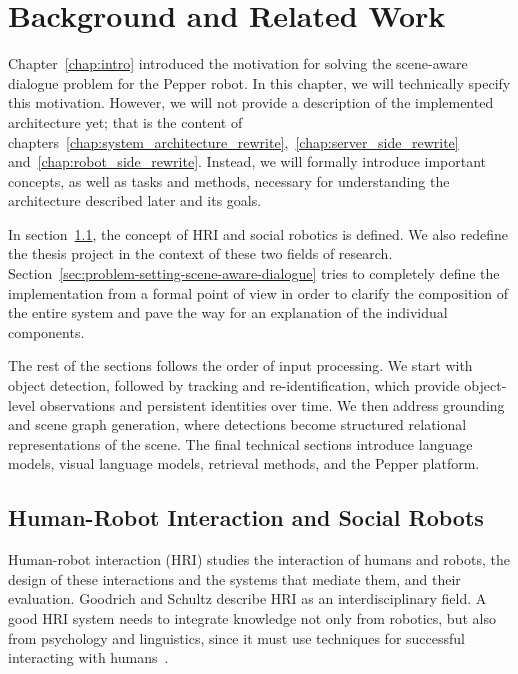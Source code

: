 \chapter{Background and Related Work}\label{chap:background}
Chapter~\ref{chap:intro} introduced the motivation for solving the scene-aware dialogue problem for the Pepper robot.
In this chapter, we will technically specify this motivation. However, we will not provide a description of the implemented architecture yet; that is the content of chapters~\ref{chap:system_architecture_rewrite},~\ref{chap:server_side_rewrite} and~\ref{chap:robot_side_rewrite}.
Instead, we will formally introduce important concepts, as well as tasks and methods, necessary for understanding the architecture described later and its goals.

In section~\ref{sec:hri-social-robots}, the concept of HRI and social robotics is defined. We also redefine the thesis project in the context of these two fields of research. Section~\ref{sec:problem-setting-scene-aware-dialogue} tries to completely define the implementation from a formal point of view in order to clarify the composition of the entire system and pave the way for an explanation of the individual components.

The rest of the sections follows the order of input processing. We start with object detection, followed by tracking and re-identification, which provide object-level observations and persistent identities over time. We then address grounding and scene graph generation, where detections become structured relational representations of the scene. The final technical sections introduce language models, visual language models, retrieval methods, and the Pepper platform.

\section{Human-Robot Interaction and Social Robots}\label{sec:hri-social-robots}

Human-robot interaction (HRI) studies the interaction of humans and robots, the design of these interactions and the systems that mediate them, and their evaluation. Goodrich and Schultz describe HRI as an interdisciplinary field. A good HRI system needs to integrate knowledge not only from robotics, but also from psychology and linguistics, since it must use techniques for successful interacting with humans~\cite[203--216]{goodrich_human-robot_2007}.

